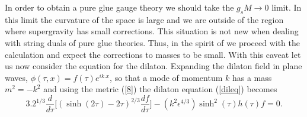 \documentclass[12pt,epsf,a4paper]{article}
\begin{document}
In order to obtain a pure glue gauge theory we should take the 
$g_s M \rightarrow 0$ limit. In this limit the curvature of the space is
 large and  we are outside of the region where supergravity has small corrections. 
This situation is not new when dealing with string duals of pure glue theories. Thus, 
in the spirit of \cite{gb1,gb2} we proceed with the calculation and expect the 
corrections to  masses to be small. With this caveat let us now consider the 
equation for the dilaton. Expanding the dilaton field in plane waves, 
$\phi (\tau,x) = f(\tau) e^{ik.x}$, so that 
a mode of momentum $k$ has a mass  $m^2 = - k^2$ and using the metric (\ref{8})
the dilaton equation (\ref{dileq}) becomes   
\begin{equation}
3.2^{1/3} \frac {d}{d \tau} \Big[ (\sinh (2 \tau) - 2 \tau)^{2/3} 
\frac {df}{d \tau} \Big] - (k^2 \epsilon^{4/3}) \sinh^2 (\tau) h(\tau) f = 0.
\label{b}
\end{equation}
    
\end{document}
